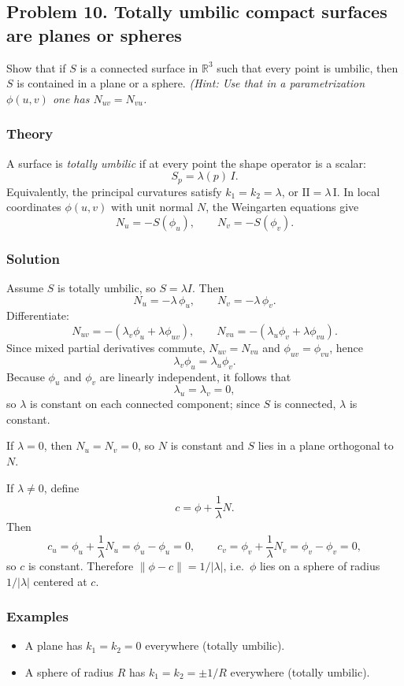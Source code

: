 \documentclass[12pt,a4paper]{article}
\theoremstyle{plain}
\theoremstyle{definition}      %
\begin{document}
	
	\subsection*{Problem 10. Totally umbilic compact surfaces are planes or spheres}
	Show that if $S$ is a connected surface in $\mathbb R^3$ such that every point is umbilic, then
	$S$ is contained in a plane or a sphere.
	\emph{(Hint: Use that in a parametrization $\phi(u,v)$ one has $N_{uv}=N_{vu}$.}
	
	\subsubsection*{Theory}
	A surface is \emph{totally umbilic} if at every point the shape operator is a scalar:
	\[
	S_p=\lambda(p)\,I.
	\]
	Equivalently, the principal curvatures satisfy $k_1=k_2=\lambda$, or $\mathrm{II}=\lambda\,\mathrm{I}$.
	In local coordinates $\phi(u,v)$ with unit normal $N$, the Weingarten equations give
	\[
	N_u=-S(\phi_u),\qquad N_v=-S(\phi_v).
	\]
	
	\subsubsection*{Solution}

	Assume $S$ is totally umbilic, so $S=\lambda I$. Then
	\[
	N_u=-\lambda\,\phi_u,\qquad N_v=-\lambda\,\phi_v.
	\]
	Differentiate:
	\[
	N_{uv}=-(\lambda_v\phi_u+\lambda\phi_{uv}),\qquad
	N_{vu}=-(\lambda_u\phi_v+\lambda\phi_{vu}).
	\]
	Since mixed partial derivatives commute, $N_{uv}=N_{vu}$ and $\phi_{uv}=\phi_{vu}$, hence
	\[
	\lambda_v\phi_u=\lambda_u\phi_v.
	\]
	Because $\phi_u$ and $\phi_v$ are linearly independent, it follows that
	\[
	\lambda_u=\lambda_v=0,
	\]
	so $\lambda$ is constant on each connected component; since $S$ is connected, $\lambda$ is constant.
	
	If $\lambda=0$, then $N_u=N_v=0$, so $N$ is constant and $S$ lies in a plane orthogonal to $N$.
	
	If $\lambda\neq 0$, define
	\[
	c=\phi+\frac{1}{\lambda}N.
	\]
	Then
	\[
	c_u=\phi_u+\frac{1}{\lambda}N_u=\phi_u-\phi_u=0,\qquad
	c_v=\phi_v+\frac{1}{\lambda}N_v=\phi_v-\phi_v=0,
	\]
	so $c$ is constant. Therefore $\|\phi-c\|=1/|\lambda|$, i.e.\ $\phi$ lies on a sphere of radius
	$1/|\lambda|$ centered at $c$.
	
	\subsubsection*{Examples}
	\begin{itemize}
		\item A plane has $k_1=k_2=0$ everywhere (totally umbilic).
		\item A sphere of radius $R$ has $k_1=k_2=\pm 1/R$ everywhere (totally umbilic).
	\end{itemize}
	
\end{document}
